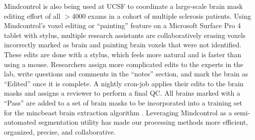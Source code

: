 Mindcontrol is also being used at UCSF to coordinate a large-scale brain mask editing effort of all $>$4000 exams in a cohort of multiple sclerosis patients. Using Mindcontrol's voxel editing or ``painting'' feature on a Microsoft Surface Pro 4 tablet with stylus, multiple research assistants are collaboratively erasing voxels incorrectly marked as brain and painting brain voxels that were not identified.  These edits are done with a stylus, which feels more natural and is faster than using a mouse. Researchers assign more complicated edits to the experts in the lab, write questions and comments in the ``notes'' section, and mark the brain as ``Edited'' once it is complete. A nightly cron-job applies their edits to the brain masks and assigns a reviewer to perform a final QC. All brains marked with a ``Pass'' are added to a set of brain masks to be incorporated into a training set for the mincbeast brain extraction algorithm \cite{eskildsen2012beast}. Leveraging Mindcontrol as a semi-automated segmentation utility has made our processing methods more efficient, organized, precise, and collaborative.